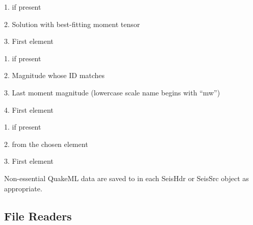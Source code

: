 \documentclass[letterpaper,11pt,english]{sphinxmanual}
\begin{document}
\begin{DUlineblock}{0em}
\item[] 
\item[]
\begin{DUlineblock}{\DUlineblockindent}
\item[] 1.  if present
\item[] 2. Solution with best-fitting moment tensor
\item[] 3. First  element
\item[] 
\end{DUlineblock}
\item[] 
\item[]
\begin{DUlineblock}{\DUlineblockindent}
\item[] 1.  if present
\item[] 2. Magnitude whose ID matches 
\item[] 3. Last moment magnitude (lowercase scale name begins with “mw”)
\item[] 4. First  element
\item[] 
\end{DUlineblock}
\item[] 
\item[]
\begin{DUlineblock}{\DUlineblockindent}
\item[] 1.  if present
\item[] 2.  from the chosen  element
\item[] 3. First  element
\end{DUlineblock}
\end{DUlineblock}

Non-essential QuakeML data are saved to  in each SeisHdr or SeisSrc object
as appropriate.


\subsection{File Readers}
\label{\detokenize{src/Submodules/quake:file-readers}}
\end{document}
